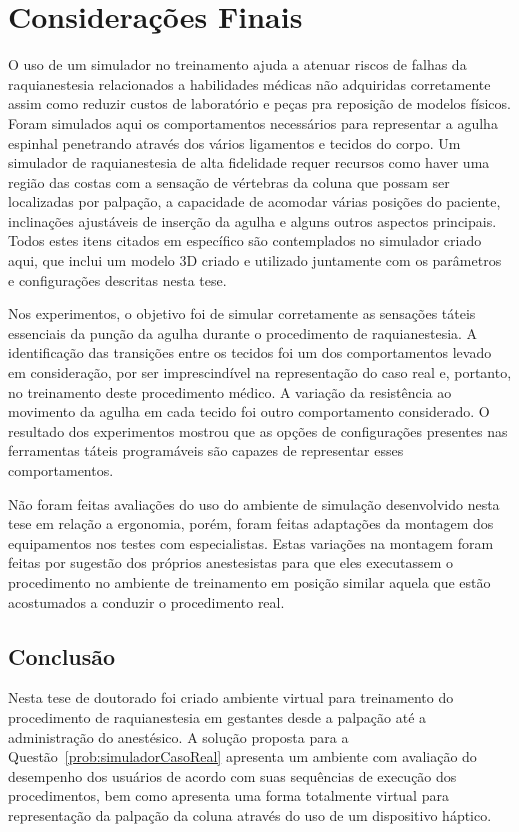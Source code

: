 \chapter{Considerações Finais} \label{cap:cap7}

O uso de um simulador no treinamento ajuda a atenuar riscos de falhas da raquianestesia relacionados a habilidades médicas não adquiridas corretamente assim como reduzir custos de laboratório e peças pra reposição de modelos físicos. Foram simulados aqui os comportamentos necessários para representar a agulha espinhal penetrando através dos vários ligamentos e tecidos do corpo. Um simulador de raquianestesia de alta fidelidade requer recursos como haver uma região das costas com a sensação de vértebras da coluna que possam ser localizadas por palpação, a capacidade de acomodar várias posições do paciente, inclinações ajustáveis de inserção da agulha e alguns outros aspectos principais. Todos estes itens citados em específico são contemplados no simulador criado aqui, que inclui um modelo 3D criado e utilizado juntamente com os parâmetros e configurações descritas nesta tese. 

Nos experimentos, o objetivo foi de simular corretamente as sensações táteis essenciais da punção da agulha durante o procedimento de raquianestesia. A identificação das transições entre os tecidos foi um dos comportamentos levado em consideração, por ser imprescindível na representação do caso real e, portanto, no treinamento deste procedimento médico.
A variação da resistência ao movimento da agulha em cada tecido foi outro comportamento considerado. O resultado dos experimentos mostrou que as opções de configurações presentes nas ferramentas táteis programáveis são capazes de representar esses comportamentos.

Não foram feitas avaliações do uso do ambiente de simulação desenvolvido nesta tese em relação a ergonomia, porém, foram feitas adaptações da montagem dos equipamentos nos testes com especialistas. Estas variações na montagem foram feitas por sugestão dos próprios anestesistas para que eles executassem o procedimento no ambiente de treinamento em posição similar aquela que estão acostumados a conduzir o procedimento real.

\section{Conclusão}
\label{sec:conclusão}

Nesta tese de doutorado foi criado ambiente virtual para treinamento do procedimento de raquianestesia em gestantes desde a palpação até a administração do anestésico. A solução proposta para a Questão~\ref{prob:simuladorCasoReal} apresenta um ambiente com avaliação do desempenho dos usuários de acordo com suas sequências de execução dos procedimentos, bem como apresenta uma forma totalmente virtual para representação da palpação da coluna através do uso de um dispositivo háptico.

